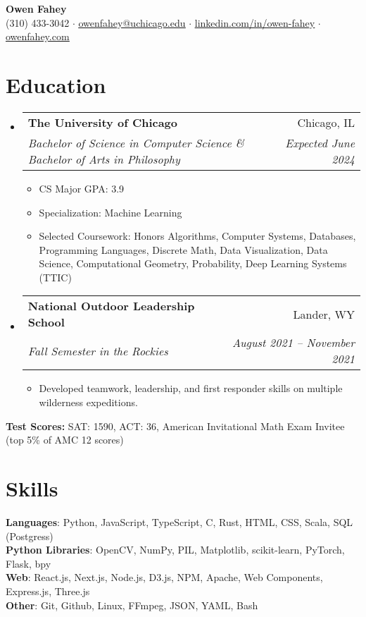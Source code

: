 \documentclass[letterpaper,11pt]{article}
\makeatletter
\newcommand{\resumeItem}[1]{
  \item\small{
    {#1 \vspace{-2pt}}
  }
}
\newcommand{\resumeSubheading}[4]{
  \vspace{-2pt}\item
    \begin{tabular*}{0.97\textwidth}[t]{l@{\extracolsep{\fill}}r}
      \textbf{#1} & #2 \\
      \textit{\small#3} & \textit{\small #4} \\
    \end{tabular*}\vspace{-7pt}
}
\newcommand{\resumeSubHeadingListStart}{\begin{itemize}[leftmargin=0.125in, label={}]}
\newcommand{\resumeSubHeadingListEnd}{\end{itemize}}
\newcommand{\resumeItemListStart}{\begin{itemize}[leftmargin=0.25in]
}
\newcommand{\resumeItemListEnd}{\end{itemize}\vspace{-5pt}}
\makeatother
\begin{document}
\begin{center}

  \textbf{\Huge 
Owen Fahey} \\
  \small (310) 433-3042 $\cdot$
  \href{mailto:owenfahey@uchicago.edu}{\underline{owenfahey@uchicago.edu}} $\cdot$
  \href{https://www.linkedin.com/in/owen-fahey}{\underline{linkedin.com/in/owen-fahey}} $\cdot$
  \href{https://owenfahey.com}{\underline{owenfahey.com}}
\end{center}

\section{Education}
  \resumeSubHeadingListStart
    \resumeSubheading
      {The University of Chicago}{Chicago, IL}
      {Bachelor of Science in Computer Science \& Bachelor of Arts in Philosophy}{Expected June 2024}
      \resumeItemListStart
        \resumeItem{CS Major GPA: 3.9}
        \resumeItem {Specialization: Machine Learning}
        \resumeItem{{Selected Coursework:} Honors Algorithms, Computer Systems, Databases, Programming Languages, Discrete Math, Data Visualization, Data Science, Computational Geometry, Probability, Deep Learning Systems (TTIC)}
      \resumeItemListEnd
    \resumeSubheading
      {National Outdoor Leadership School}{Lander, WY}
      {Fall Semester in the Rockies}{August 2021 -- November 2021}
      \resumeItemListStart
        \resumeItem{Developed teamwork, leadership, and first responder skills on multiple wilderness expeditions.}
      \resumeItemListEnd
  \resumeSubHeadingListEnd
  {
    \vspace{-4pt}
    \noindent\hspace{0.15in}\small\textbf{Test Scores:} SAT: 1590, ACT: 36, American Invitational Math Exam Invitee (top 5\% of AMC 12 scores)
    \vspace{-5pt}
    }
\section{Skills}
  \begin{itemize}[leftmargin=0.15in, label={}]
    \small{\item{
      \textbf{Languages}{: Python, JavaScript, TypeScript, C, Rust, HTML, CSS, Scala, SQL (Postgress)} \\
      \textbf{Python Libraries}{: OpenCV, NumPy, PIL, Matplotlib, scikit-learn, PyTorch, Flask, bpy} \\
      \textbf{Web}{: React.js, Next.js, Node.js, D3.js, NPM, Apache, Web Components, Express.js, Three.js} \\
      \textbf{Other}{: Git, Github, Linux, FFmpeg, JSON, YAML, Bash}}}
      {\vspace{-5pt}}
  \end{itemize}
  
\end{document}
